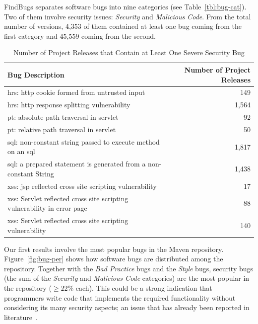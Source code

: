 \documentclass[conference]{llncs}
\begin{document}
FindBugs separates software bugs into nine categories (see
Table~\ref{tbl:bug-cat}). Two of them involve security issues: {\it Security} and {\it
Malicious Code}. From the total number of versions, 4,353 of them contained
at least one bug coming from the first category
and 45,559 coming from the second.

\begin{table}[t]
\centering
\caption{Number of Project Releases that Contain at Least One Severe Security Bug}
\label{tbl:sev}
\leavevmode
	\begin{tabular}{p{25em} r}
	\hline
	Bug Description & Number of Project Releases\\
 	\hline
	{\sc hrs}: {\sc http} cookie formed from untrusted input & 149\\
	{\sc hrs}: {\sc http} response splitting vulnerability & 1,564\\
	{\sc pt}: absolute path traversal in servlet  & 92\\
	{\sc pt}: relative path traversal in servlet & 50\\
	{\sc sql}: non-constant string passed to execute method on an {\sc sql} & 1,817\\
	{\sc sql}: a prepared statement is generated from a non-constant String & 1,438\\
	{\sc xss}: {\sc jsp} reflected cross site scripting vulnerability & 17\\
	{\sc xss}: Servlet reflected cross site scripting vulnerability in error page & 88\\
	{\sc xss}: Servlet reflected cross site scripting vulnerability & 140\\
	\hline
	\end{tabular}
\end{table}

Our first results involve the most popular bugs in the Maven repository.
Figure~\ref{fig:bug-per} shows how software bugs are distributed among the
repository. Together with the {\it Bad Practice} bugs and the {\it Style} bugs,
security bugs (the sum of the {\it Security} and {\it Malicious Code}
categories) are the most popular in the repository ($\geq 22\%$ each).
This could be a strong indication that programmers write code
that implements the required functionality without considering its many
security aspects; an issue that has already been reported in
literature~\cite{SH09}.
\end{document}
